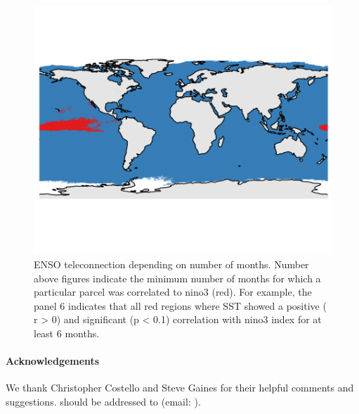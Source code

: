 \documentclass[11pt]{article}
\begin{document}
\begin{figure}
\centering
\includegraphics{img/cor_sst_nino34_var.pdf}
\caption{ENSO teleconnection depending on number of months. Number above figures indicate the minimum number of months for which a particular
parcel was correlated to nino3 (red). For example, the panel 6 indicates that all red regions where SST showed a positive ( r \textgreater{} 0)
and significant (p \textless{} 0.1) correlation with nino3 index for at least 6 months.}
\end{figure}




\newpage




 \paragraph{Acknowledgements} We thank Christopher Costello and Steve Gaines for their helpful comments and suggestions.
should be addressed to (email: ).
\end{document}
